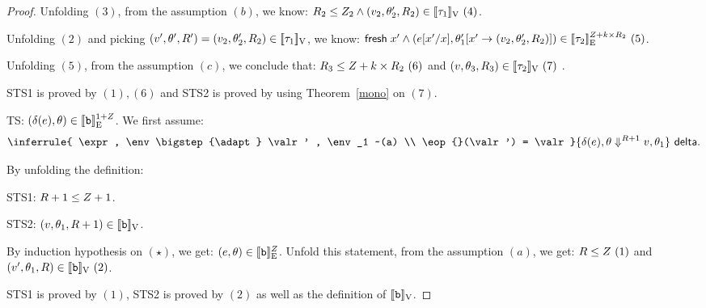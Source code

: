 \begin{proof}
Unfolding $(3)$, from the assumption $(b)$, we know: $\adapt_2 \leq \nnatA_2 \land (\valr_2, \env_2', \adapt_2) \in \lrv{\type_1} ~(4)$.

Unfolding $(2)$ and picking $(\valr', \env', R') = (\valr_2, \env_2', \adapt_2) \in \lrv{\type_1} $,  we know: $ \fresh \eapp x' \land  (  \expr[x'/x], \env_1'[ x'  \to (\valr_2, \env_2', \adapt_2  ) ]  ) \in \lre{}{\nnatA+\idx\times R_2 }{\type_2} ~(5) $.

Unfolding $(5)$, from the assumption $(c)$, we conclude that: $ \adapt_3 \leq \nnatA+\idx\times R_2~(6)$ and $(\valr, \env_3, \adapt_3) \in \lrv{\type_2} ~(7) $ .

STS1 is proved by $(1), (6)$ and STS2 is proved by using Theorem~\ref{mono} on $(7)$. \\


 TS: $(\delta(\expr), \env ) \in  \lre{}{ 1+ \nnatA}{ \tbase }$.
 We first assume:
 \[ \inferrule{
    \expr , \env \bigstep{\adapt} \valr' , \env_1 ~(a) \\
    \eop{}(\valr') = \valr
  }{
    \eop(\expr), \env \bigstep{\adapt +1} \valr,  \env_1
  }~\textsf{delta}.
  \]

  By unfolding the definition:

  STS1: $\adapt+1 \leq \nnatA +1$.
  
STS2: $ (\valr, \env_1, \adapt+1) \in \lrv{\tbase} $.

By induction hypothesis on $(\star)$, we get: $ (\expr, \env) \in \lre{}{\nnatA}{\tbase} $.
Unfold this statement, from the assumption $(a)$, we get: $ \adapt \leq \nnatA~(1) $ and $ (\valr', \env_1, \adapt)  \in \lrv{\tbase}~(2)$.

STS1 is proved by $(1)$,  STS2 is proved by $(2)$ as well as the definition of $\lrv{\tbase}$.





 \end{proof} 